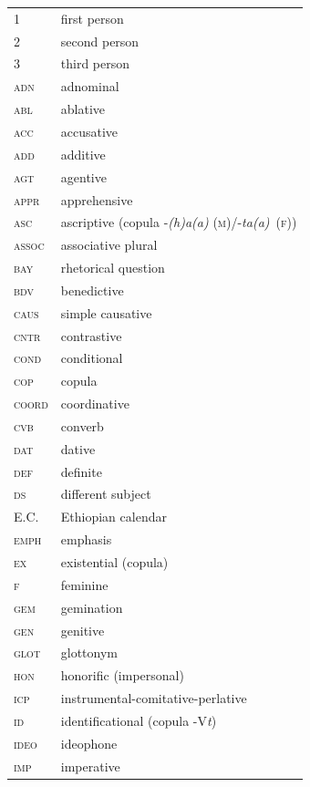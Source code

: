\documentclass[output=paper,colorlinks,citecolor=brown,draftmode
]{langscibook}
\begin{document}
\begin{tabularx}{.45\textwidth}{lQ}
1 & first person\\
2 & second person\\
3 & third person\\
\textsc{\textsc{adn}} & adnominal\\
\textsc{abl} & ablative\\
\textsc{acc} & accusative\\
\textsc{add} & additive\\
\textsc{agt}	& agentive\\
\textsc{appr} & apprehensive\\
\textsc{asc} & ascriptive (copula  -\textit{(h)a(a)} (\textsc{m})/\hspace{0pt}-\textit{ta(a)}~(\textsc{f}))\\ 
\textsc{assoc} & associative plural\\
\textsc{bay} & rhetorical question\\
\textsc{bdv} & benedictive\\
\textsc{caus} & simple causative\\
\textsc{cntr} & contrastive\\
\textsc{cond} &	conditional\\
\textsc{cop} &  copula\\
\textsc{coord} & coordinative\\
\textsc{cvb} & converb\\
\textsc{dat} & dative\\
\textsc{def} & definite\\
\textsc{ds}	& different subject\\
E.C. & Ethiopian calendar \\
\textsc{emph} & emphasis\\
\textsc{ex} & existential (copula)\\
\textsc{f} & feminine\\
\textsc{gem} & gemination\\
\textsc{gen} &	genitive\\
\textsc{glot} & glottonym\\
\textsc{hon} &	honorific (impersonal)\\
\textsc{icp} &	instrumental-comitative-perlative\\
\textsc{id} &identificational (copula -V\textit{t})\\ \textsc{ideo} &	ideophone\\
\textsc{imp} &	imperative\\
\end{tabularx}
\end{document}

